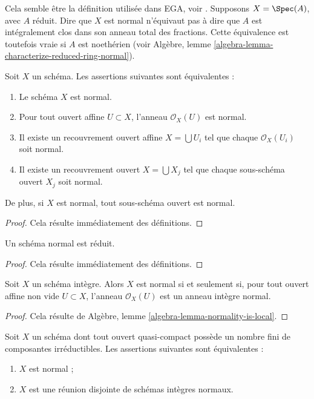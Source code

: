 \noindent
Cela semble être la définition utilisée dans EGA, voir \cite[0, 4.1.4]{EGA}.
Supposons $X = \Spec(A)$, avec $A$ réduit. Dire que $X$ est
normal n'équivaut pas à dire que $A$ est intégralement clos dans son anneau
total des fractions. Cette équivalence est toutefois vraie si $A$ est noethérien (voir
Algèbre, lemme \ref{algebra-lemma-characterize-reduced-ring-normal}).

\begin{lemma}
\label{lemma-locally-normal}
Soit $X$ un schéma. Les assertions suivantes sont équivalentes :
\begin{enumerate}
\item Le schéma $X$ est normal.
\item Pour tout ouvert affine $U \subset X$, l'anneau $\mathcal{O}_X(U)$
est normal.
\item Il existe un recouvrement ouvert affine $X = \bigcup U_i$ tel que
chaque $\mathcal{O}_X(U_i)$ soit normal.
\item Il existe un recouvrement ouvert $X = \bigcup X_j$
tel que chaque sous-schéma ouvert $X_j$ soit normal.
\end{enumerate}
De plus, si $X$ est normal, tout sous-schéma ouvert
est normal.
\end{lemma}

\begin{proof}
Cela résulte immédiatement des définitions.
\end{proof}

\begin{lemma}
\label{lemma-normal-reduced}
Un schéma normal est réduit.
\end{lemma}

\begin{proof}
Cela résulte immédiatement des définitions.
\end{proof}

\begin{lemma}
\label{lemma-integral-normal}
Soit $X$ un schéma intègre.
Alors $X$ est normal si et seulement si, pour tout ouvert affine non vide
$U \subset X$, l'anneau $\mathcal{O}_X(U)$ est un anneau intègre normal.
\end{lemma}

\begin{proof}
Cela résulte de
Algèbre, lemme \ref{algebra-lemma-normality-is-local}.
\end{proof}

\begin{lemma}
\label{lemma-normal-locally-finite-nr-irreducibles}
Soit $X$ un schéma dont tout ouvert quasi-compact possède un nombre fini de
composantes irréductibles. Les assertions suivantes sont équivalentes :
\begin{enumerate}
\item $X$ est normal ;
\item $X$ est une réunion disjointe de schémas intègres normaux.
\end{enumerate}
\end{lemma}

